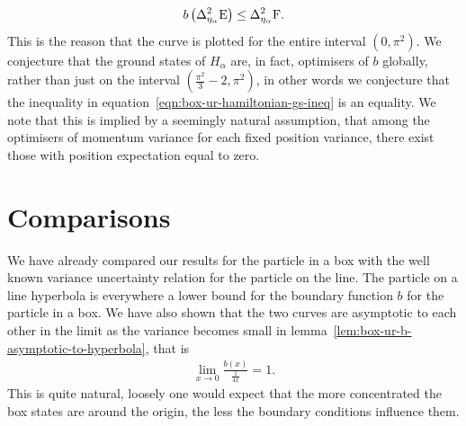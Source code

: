 \begin{align}\label{eqn:box-ur-hamiltonian-gs-ineq}
  b\left(\var[\eta_\alpha]{\ope}\right) \leq \var[\eta_\alpha]{\opf}.
\end{align}
This is the reason that the curve is plotted for the entire interval $(0, \pi^2)$. We conjecture that the ground states of $H_\alpha$ are, in fact, optimisers of $b$ globally, rather than just on the interval $\left(\frac{\pi^2}{3} -2, \pi^2\right)$, in other words we conjecture that the inequality in equation~\ref{eqn:box-ur-hamiltonian-gs-ineq} is an equality. We note that this is implied by a seemingly natural assumption, that among the optimisers of momentum variance for each fixed position variance, there exist those with position expectation equal to zero.

\section{Comparisons}\label{sec:box-ur-comparisons}

We have already compared our results for the particle in a box with the well known variance uncertainty relation for the particle on the line. The particle on a line hyperbola is everywhere a lower bound for the boundary function $b$ for the particle in a box. We have also shown that the two curves are asymptotic to each other in the limit as the variance becomes small in lemma~\ref{lem:box-ur-b-asymptotic-to-hyperbola}, that is
\begin{align}
  \lim_{x\to 0} \frac{b(x)}{\frac{1}{4x}} = 1.
\end{align}
This is quite natural, loosely one would expect that the more concentrated the box states are around the origin, the less the boundary conditions influence them. 

